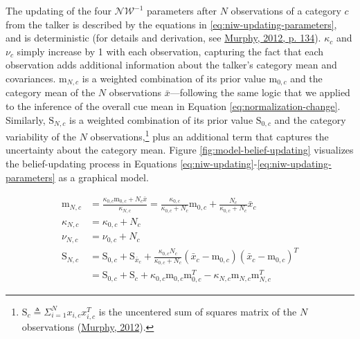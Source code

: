\documentclass[
  11pt,
  english,
  man,floatsintext]{apa6}
\begin{document}
The updating of the four \(\mathcal{NW^{-1}}\) parameters after \(N\) observations of a category \(c\) from the talker is described by the equations in \eqref{eq:niw-updating-parameters}, and is deterministic (for details and derivation, see \protect\hyperlink{ref-murphy2012}{Murphy, 2012, p. 134}). \(\kappa_c\) and \(\nu_c\) simply increase by 1 with each observation, capturing the fact that each observation adds additional information about the talker's category mean and covariances. \(\mathrm{m}_{N,c}\) is a weighted combination of its prior value \(\mathrm{m}_{0,c}\) and the category mean of the \(N\) observations \(\bar{x}\)---following the same logic that we applied to the inference of the overall cue mean in Equation \eqref{eq:normalization-change}. Similarly, \(\mathrm{S}_{N,c}\) is a weighted combination of its prior value \(\mathrm{S}_{0,c}\) and the category variability of the \(N\) observations,\footnote{\(\mathrm{S}_c \triangleq \Sigma_{i=1}^N x_{i,c} x_{i,c}^T\) is the uncentered sum of squares matrix of the \(N\) observations (\protect\hyperlink{ref-murphy2012}{Murphy, 2012}).} plus an additional term that captures the uncertainty about the category mean. Figure \ref{fig:model-belief-updating} visualizes the belief-updating process in Equations \eqref{eq:niw-updating}-\eqref{eq:niw-updating-parameters} as a graphical model.

\begin{equation}\label{eq:niw-updating-parameters}
\begin{split}
\mathrm{m}_{N,c} & = \frac{\kappa_{0,c} \mathrm{m}_{0,c} + N_c \bar{x}}{\kappa_{N,c}} = \frac{\kappa_{0,c}}{\kappa_{0,c} + N_c} \mathrm{m}_{0,c} + \frac{N_c}{\kappa_{0,c} + N_c}\bar{x}_c \\
\kappa_{N,c} & = \kappa_{0,c} + N_c \\
\nu_{N,c} & = \nu_{0,c} + N_c \\
\mathrm{S}_{N,c} & = \mathrm{S}_{0,c} + \mathrm{S}_{\bar{x}_c} + \frac{\kappa_{0,c} N_c}{\kappa_{0,c} + N_c}\left( \bar{x}_c-\mathrm{m}_{0,c} \right) \left( \bar{x}_c-\mathrm{m}_{0,c} \right)^T \\
 & = \mathrm{S}_{0,c} + \mathrm{S}_c + \kappa_{0,c} \mathrm{m}_{0,c} \mathrm{m}_{0,c}^T - \kappa_{N,c} \mathrm{m}_{N,c} \mathrm{m}_{N,c}^T
\end{split}
\end{equation}
\end{document}
